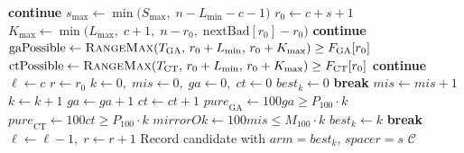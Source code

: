 \documentclass{article}
\begin{document}
\begin{algorithm}
\begin{algorithmic}[1]
     
        \State \textbf{continue}
    \EndIf
    \State $s_{\max} \gets \min\bigl(S_{\max},\; n - L_{\min} - c - 1\bigr)$
        \State $r_0 \gets c + s + 1$ 
        \State $K_{\max} \gets \min\bigl(L_{\max},\; c+1,\; n-r_0,\;
               \mathrm{nextBad}[r_0]-r_0\bigr)$
            \State \textbf{continue}
        \EndIf
        \State $\mathrm{gaPossible} \gets
               \textsc{RangeMax}(T_{\mathrm{GA}},\, r_0+L_{\min},\, r_0+K_{\max})
               \ge F_{\mathrm{GA}}[r_0]$
        \State $\mathrm{ctPossible} \gets
               \textsc{RangeMax}(T_{\mathrm{CT}},\, r_0+L_{\min},\, r_0+K_{\max})
               \ge F_{\mathrm{CT}}[r_0]$
            \State \textbf{continue} 
        \EndIf
        \State $\ell \gets c$ 
        \State $r \gets r_0$ 
        \State $k \gets 0,\; \textit{mis} \gets 0,\; \textit{ga} \gets 0,\; \textit{ct} \gets 0$
        \State $\textit{best}_k \gets 0$
             \State \textbf{break} \EndIf
             \State $\textit{mis} \gets \textit{mis} + 1$ \EndIf
            \State $k \gets k + 1$
             $\textit{ga} \gets \textit{ga} + 1$ \Else $\textit{ct} \gets \textit{ct} + 1$ \EndIf
                \State $\textit{pure}_{\text{GA}} \gets 100\textit{ga} \ge P_{100} \cdot k$
                \State $\textit{pure}_{\text{CT}} \gets 100\textit{ct} \ge P_{100} \cdot k$
                \State $\textit{mirrorOk} \gets 100\textit{mis} \le M_{100} \cdot k$
                    \State $\textit{best}_k \gets k$ 
                \EndIf
                 \State \textbf{break} \EndIf
            \EndIf
            \State $\ell \gets \ell - 1,\; r \gets r + 1$
        \EndWhile
            \State Record candidate with $\textit{arm} = \textit{best}_k$, $\textit{spacer} = s$ 
        \EndIf
    \EndFor
\EndFor
\State \Return $\mathcal{C}$
\end{algorithmic}
\end{algorithm}
\end{document}
